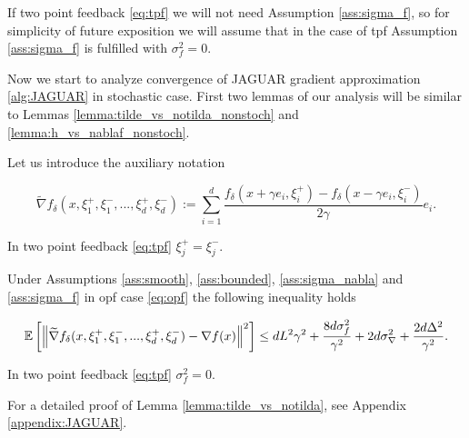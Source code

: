         If two point feedback \eqref{eq:tpf} we will not need Assumption \ref{ass:sigma_f}, so for simplicity of future exposition we will assume that in the case of tpf Assumption \ref{ass:sigma_f} is fulfilled with $\sigma_f^2 = 0$.
    
        Now we start to analyze convergence of JAGUAR gradient approximation \ref{alg:JAGUAR} in stochastic case. First two lemmas of our analysis will be similar to Lemmas \ref{lemma:tilde_vs_notilda_nonstoch} and \ref{lemma:h_vs_nablaf_nonstoch}.
    
        \begin{lemma}
            \label{lemma:tilde_vs_notilda}
            Let us introduce the auxiliary notation
    
            \begin{equation}
            \label{eq:opf_d}
                \widetilde{\nabla}f_{\delta}(x, \xi^+_1, \xi^-_1, ... , \xi_d^+, \xi_d^-) := \sum\limits_{i=1}^d \dfrac{f_{\delta}(x + \gamma e_i, \xi_i^+) - f_{\delta}(x - \gamma e_i, \xi_i^-)}{2 \gamma} e_i.
            \end{equation}
    
            In two point feedback \eqref{eq:tpf} $\xi_j^+ = \xi_j^-$.
            
            Under Assumptions \ref{ass:smooth}, \ref{ass:bounded}, \ref{ass:sigma_nabla} and \ref{ass:sigma_f} in opf case \eqref{eq:opf} the following inequality holds
    
            \begin{equation}
            \label{eq:diff_full}
                \mathbb{E}\left[ \left\| \widetilde{\nabla}f_{\delta}(x, \xi^+_1, \xi^-_1, ... , \xi_d^+, \xi_d^-) - \nabla f(x) \right\|^2 \right] 
                \leq d L^2 \gamma^2 
                + \frac{8 d \sigma_f^2}{\gamma^2} 
                + 2 d \sigma_{\nabla}^2 + \frac{2 d \Delta^2}{\gamma^2}.
            \end{equation}
    
            In two point feedback \eqref{eq:tpf} $\sigma_f^2 = 0$.
        \end{lemma}
    
        For a detailed proof of Lemma \ref{lemma:tilde_vs_notilda}, see Appendix \ref{appendix:JAGUAR}. 
    
